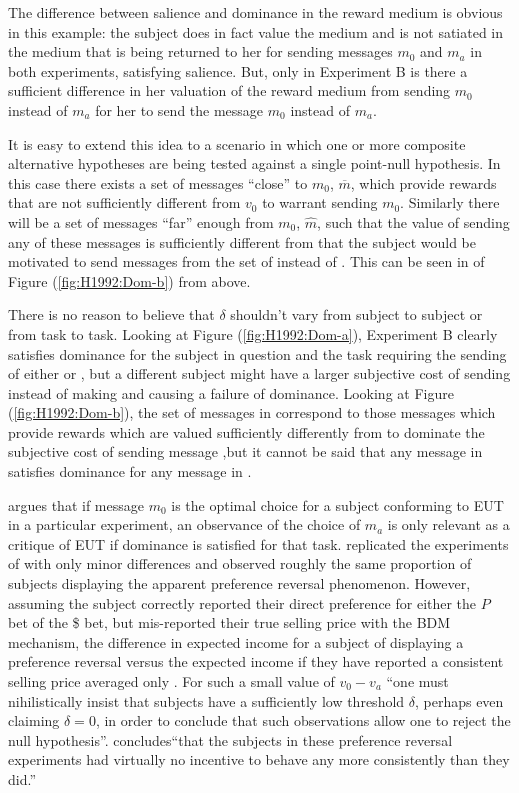 \documentclass[../main.tex]{subfiles}
\begin{document}
The difference between salience and dominance in the reward medium is obvious in this example: the subject does in fact value the medium and is not satiated in the medium that is being returned to her for sending messages $m_0$ and $m_a$ in both experiments, satisfying salience.
But, only in Experiment B is there a sufficient difference in her valuation of the reward medium from sending $m_0$ instead of $m_a$ for her to send the message $m_0$ instead of $m_a$.

It is easy to extend this idea to a scenario in which one or more composite alternative hypotheses are being tested against a single point-null hypothesis.
In this case there exists a set of messages \enquote{close} to $m_0$, $\overbar{m}$, which provide rewards that are not sufficiently different from $v_0$ to warrant sending $m_0$.
Similarly there will be a set of messages \enquote{far} enough from $m_0$, $\hat{m}$, such that the value of sending any of these messages is sufficiently different from  that the subject would be motivated to send messages from the set of  instead of .
This can be seen in of Figure (\ref{fig:H1992:Dom-b}) from \textcite{Harrison1992} above.

There is no reason to believe that $\delta$ shouldn't vary from subject to subject or from task to task.
Looking at Figure (\ref{fig:H1992:Dom-a}), Experiment B clearly satisfies dominance for the subject in question and the task requiring the sending of either  or , but a different subject might have a larger subjective cost of sending  instead of  making  and causing a failure of dominance.
Looking at Figure (\ref{fig:H1992:Dom-b}), the set of messages in  correspond to those messages which provide rewards which are valued sufficiently differently from  to dominate the subjective cost of sending message ,but it cannot be said that any message in  satisfies dominance for any message in .


\textcite{Harrison1989} argues that if message $m_0$ is the optimal choice for a subject conforming to EUT in a particular experiment, an observance of the choice of $m_a$ is only relevant as a critique of EUT if dominance is satisfied for that task.
\textcite{Harrison1994} replicated the experiments of\textcite{Grether1979} with only minor differences and observed roughly the same proportion of subjects displaying the apparent preference reversal phenomenon.
However, assuming the subject correctly reported their direct preference for either the $P$ bet of the \$ bet, but mis-reported their true selling price with the BDM mechanism, the difference in expected income for a subject of displaying a preference reversal versus the expected income if they have reported a consistent selling price averaged only . 
For such a small value of $v_0 - v_a$ \enquote{one must nihilistically insist that subjects have a sufficiently low threshold $\delta$, perhaps even claiming $\delta = 0$, in order to conclude that such observations allow one to reject the null hypothesis}\parencite[1428]{Harrison1992}.
\textcite[237]{Harrison1994} concludes\enquote{that the subjects in these preference reversal experiments had virtually no incentive to behave any more consistently than they did.}
\end{document}
